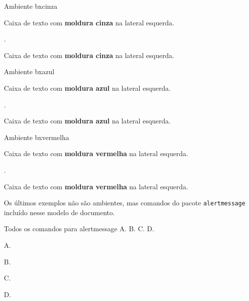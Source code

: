 \begin{codex}{Ambiente bxcinza}
    \begin{bxcinza}
      Caixa de texto com \textbf{moldura cinza} na lateral esquerda. 
    \end{bxcinza}
\end{codex}
.
\begin{bxcinza}
      Caixa de texto com \textbf{moldura cinza} na lateral esquerda. 
\end{bxcinza}


\begin{codex}{Ambiente bxazul}
    \begin{bxazul}
      Caixa de texto com \textbf{moldura azul} na lateral esquerda. 
    \end{bxazul}
\end{codex}
.
\begin{bxazul}
      Caixa de texto com \textbf{moldura azul} na lateral esquerda. 
\end{bxazul}

\begin{codex}{Ambiente bxvermelha}
    \begin{bxvermelha}
      Caixa de texto com \textbf{moldura vermelha} na lateral esquerda. 
    \end{bxvermelha}
\end{codex}
.
\begin{bxvermelha}
   Caixa de texto com \textbf{moldura vermelha} na lateral esquerda. 
\end{bxvermelha}

Os últimos exemplos não são ambientes, mas comandos do pacote \verb|alertmessage| incluído nesse modelo de documento.

\begin{codex}{Todos os comandos para alertmessage}
    A. 
    B. 
    C. 
    D. 
\end{codex}

    A. 

    B. 
    
    C. 
    
    D. 